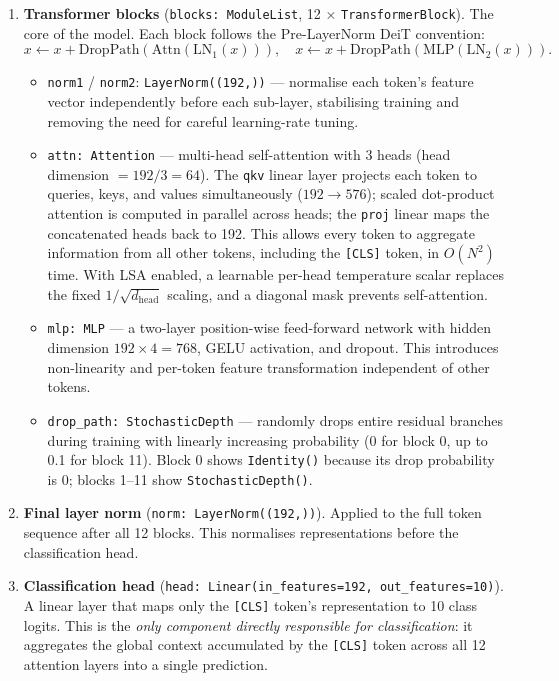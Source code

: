 \documentclass[11pt]{article}
\begin{document}
\begin{enumerate}
    \item \textbf{Transformer blocks} (\texttt{blocks: ModuleList}, 12 $\times$ \texttt{TransformerBlock}). The core of the model. Each block follows the Pre-LayerNorm DeiT convention:
    \[
      x \leftarrow x + \text{DropPath}(\text{Attn}(\text{LN}_1(x))), \quad
      x \leftarrow x + \text{DropPath}(\text{MLP}(\text{LN}_2(x))).
    \]
    \begin{itemize}
        \item \texttt{norm1} / \texttt{norm2}: \texttt{LayerNorm((192,))} — normalise each token's feature vector independently before each sub-layer, stabilising training and removing the need for careful learning-rate tuning.
        \item \texttt{attn: Attention} — multi-head self-attention with 3 heads (head dimension $= 192/3 = 64$). The \texttt{qkv} linear layer projects each token to queries, keys, and values simultaneously ($192 \to 576$); scaled dot-product attention is computed in parallel across heads; the \texttt{proj} linear maps the concatenated heads back to 192. This allows every token to aggregate information from all other tokens, including the \texttt{[CLS]} token, in $O(N^2)$ time. With LSA enabled, a learnable per-head temperature scalar replaces the fixed $1/\sqrt{d_\text{head}}$ scaling, and a diagonal mask prevents self-attention.
        \item \texttt{mlp: MLP} — a two-layer position-wise feed-forward network with hidden dimension $192 \times 4 = 768$, GELU activation, and dropout. This introduces non-linearity and per-token feature transformation independent of other tokens.
        \item \texttt{drop\_path: StochasticDepth} — randomly drops entire residual branches during training with linearly increasing probability (0 for block 0, up to 0.1 for block 11). Block 0 shows \texttt{Identity()} because its drop probability is 0; blocks 1–11 show \texttt{StochasticDepth()}.
    \end{itemize}

    \item \textbf{Final layer norm} (\texttt{norm: LayerNorm((192,))}). Applied to the full token sequence after all 12 blocks. This normalises representations before the classification head.

    \item \textbf{Classification head} (\texttt{head: Linear(in\_features=192, out\_features=10)}). A linear layer that maps only the \texttt{[CLS]} token's representation to 10 class logits. This is the \emph{only component directly responsible for classification}: it aggregates the global context accumulated by the \texttt{[CLS]} token across all 12 attention layers into a single prediction.
\end{enumerate}
\end{document}
